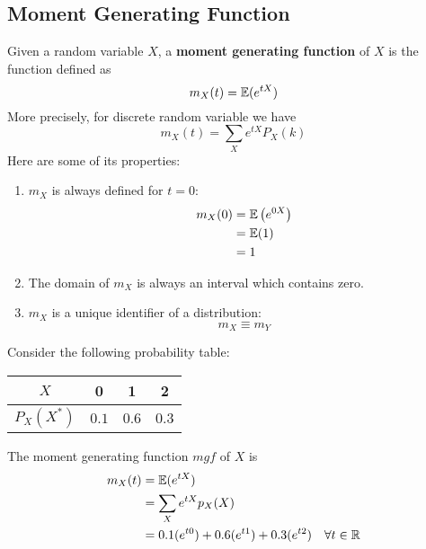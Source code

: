 \documentclass{article}
\begin{document}
\subsection{Moment Generating Function}
	\begin{defn}
		Given a random variable $X$, a \textbf{moment generating function} of $X$ is the function defined as
		$$ m_X (t) = \mathbb{E} (e^{tX})$$
		More precisely, for  discrete random variable we have
		$$ m_X (t) = \sum_{X} e^{tX} P_X (k)$$
		Here are some of its properties:
		\begin{enumerate}
			\item $m_X$ is always defined for $t=0$:
			\begin{align*}
					m_X(0) &= \mathbb{E} \left( e^{0X} \right) \\
					&= \mathbb{E} (1) \\
					&= 1
			\end{align*}
			\item The domain of $m_X$ is always an interval which contains zero.
			\item $m_X$ is a unique identifier of a distribution:
			$$ m_X \equiv m_Y$$
		\end{enumerate}
	\end{defn}
	\begin{exmp}
		Consider the following probability table:
		\begin{table}[h]
			\begin{tabular}{c|c|c|c}
				$X$ & 0     & 1    & 2 \\ \hline
				$P_X(X^*)$ & $0.1$ & $0.6$ &$0.3$
			\end{tabular}
		\end{table}
	
		The moment generating function $mgf$ of $X$ is
		\begin{align*}
			m_X (t) &= \mathbb{E} (e^{tX}) \\
			&= \sum_X e^{tX} p_X (X) \\
			&= 0.1(e^{t0}) + 0.6(e^{t1}) + 0.3(e^{t2})  \quad \forall t \in \mathbb{R}\\
 		\end{align*}
 	\end{exmp}
\end{document}
